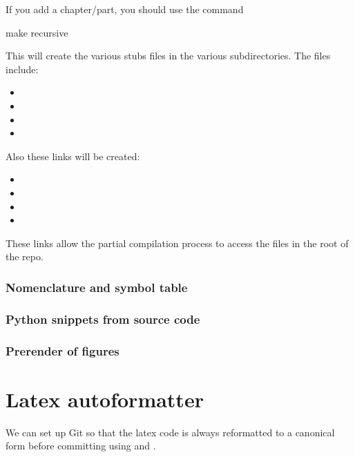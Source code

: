 If you add a chapter/part, you should use the command
%
\begin{console}
    make recursive
\end{console}

This will create the various stubs files in the various subdirectories.
The files include:
\begin{itemize}
    \item {}
    \item {}
    \item {}
    \item {}
\end{itemize}
Also these links will be created:
\begin{itemize}
    \item {}
    \item {}
    \item {}
    \item {}
\end{itemize}
These links allow the partial compilation process to access the files in the root of the repo.

\subsubsection{Nomenclature and symbol table}


\subsubsection{Python snippets from source code}


\subsubsection{Prerender of figures}


\section{Latex autoformatter}
\label{sec:latex-autoformatter}

We can set up Git so that the latex code is always reformatted to a canonical form before committing using  and .

